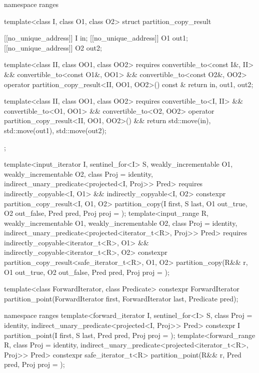 \begin{codeblock}
{  namespace ranges {
    template<class I, class O1, class O2>
    struct partition_copy_result {
      [[no_unique_address]] I  in;
      [[no_unique_address]] O1 out1;
      [[no_unique_address]] O2 out2;

      template<class II, class OO1, class OO2>
        requires convertible_to<const I&, II> &&
          convertible_to<const O1&, OO1> && convertible_to<const O2&, OO2>
        operator partition_copy_result<II, OO1, OO2>() const & {
          return {in, out1, out2};
        }

      template<class II, class OO1, class OO2>
        requires convertible_to<I, II> &&
          convertible_to<O1, OO1> && convertible_to<O2, OO2>
        operator partition_copy_result<II, OO1, OO2>() && {
          return {std::move(in), std::move(out1), std::move(out2)};
        }
    };

    template<input_iterator I, sentinel_for<I> S,
             weakly_incrementable O1, weakly_incrementable O2,
             class Proj = identity, indirect_unary_predicate<projected<I, Proj>> Pred>
      requires indirectly_copyable<I, O1> && indirectly_copyable<I, O2>
      constexpr partition_copy_result<I, O1, O2>
        partition_copy(I first, S last, O1 out_true, O2 out_false, Pred pred,
                       Proj proj = {});
    template<input_range R, weakly_incrementable O1, weakly_incrementable O2,
             class Proj = identity,
             indirect_unary_predicate<projected<iterator_t<R>, Proj>> Pred>
      requires indirectly_copyable<iterator_t<R>, O1> &&
               indirectly_copyable<iterator_t<R>, O2>
      constexpr partition_copy_result<safe_iterator_t<R>, O1, O2>
        partition_copy(R&& r, O1 out_true, O2 out_false, Pred pred, Proj proj = {});
  }

  template<class ForwardIterator, class Predicate>
    constexpr ForwardIterator
      partition_point(ForwardIterator first, ForwardIterator last,
                      Predicate pred);

  namespace ranges {
    template<forward_iterator I, sentinel_for<I> S, class Proj = identity,
             indirect_unary_predicate<projected<I, Proj>> Pred>
      constexpr I partition_point(I first, S last, Pred pred, Proj proj = {});
    template<forward_range R, class Proj = identity,
             indirect_unary_predicate<projected<iterator_t<R>, Proj>> Pred>
      constexpr safe_iterator_t<R>
        partition_point(R&& r, Pred pred, Proj proj = {});
  }

}
\end{codeblock}
